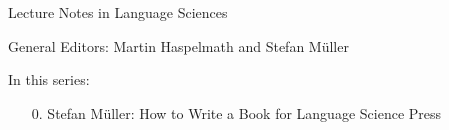 
{\large Lecture Notes in Language Sciences}

\bigskip

General Editors: Martin Haspelmath and Stefan Müller

\bigskip

In this series:

\begin{enumerate}
\item[0.]\setcounter{enumi}{0} Stefan Müller: How to Write a Book for Language Science Press
\end{enumerate}
